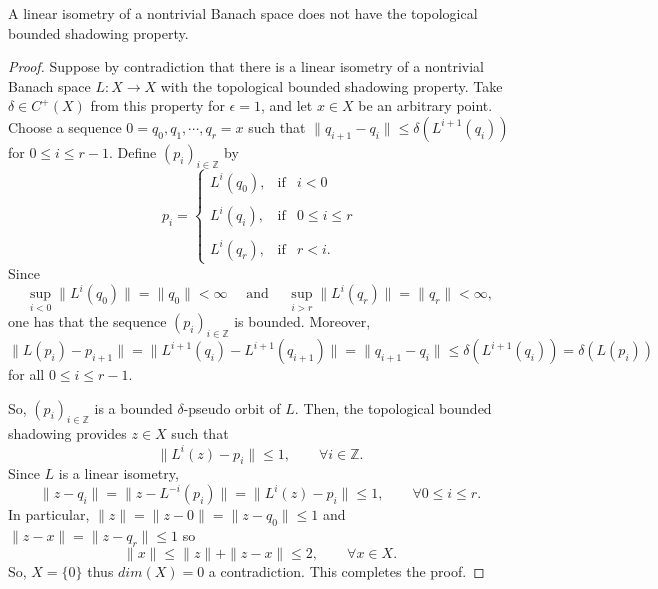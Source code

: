 \documentclass[10pt,a4paper]{amsart}
\begin{document}
\begin{lem}
\label{l1}
A linear isometry of a nontrivial Banach space does not have the topological bounded shadowing property.
\end{lem}

\begin{proof}

Suppose by contradiction that there is a linear isometry of a nontrivial Banach space $L:X\to X$ with the topological bounded shadowing property.
Take $\delta\in C^+(X)$ from this property for $\epsilon=1$,
and let $x\in X$ be an arbitrary point.
Choose a sequence
$0=q_0, q_1,\cdots, q_r=x$ such that
$\|q_{i+1}-q_i\|\leq\delta(L^{i+1}(q_i))$ for $0\leq i\leq r-1$.
Define $(p_i)_{i\in\mathbb{Z}}$ by
$$
p_i = \left\{ \begin{array}{rcl}
L^i(q_0),& \mbox{if} & i<0\\
& & \\
L^i(q_i), & \mbox{if} & 0\leq i\leq r\\
& & \\
L^i(q_r), & \mbox{if} & r<i.
\end{array} \right.
$$
Since
$$
\sup_{i<0}\|L^i(q_0)\|=\|q_0\|<\infty\quad\mbox{ and }\quad
\sup_{i>r}\|L^i(q_r)\|=\|q_r\|<\infty,
$$
one has that the sequence $(p_i)_{i\in\mathbb{Z}}$ is bounded.
Moreover,
$$
\|L(p_i)-p_{i+1}\|=\|L^{i+1}(q_i)-L^{i+1}(q_{i+1})\|=\|q_{i+1}-q_i\|\leq\delta(L^{i+1}(q_i))=\delta(L(p_i))
$$
for all $0\leq i\leq r-1$.

So, $(p_i)_{i\in\mathbb{Z}}$ is a bounded
$\delta$-pseudo orbit of $L$.
Then, the topological bounded shadowing provides
$z\in X$ such that
$$
\|L^i(z)-p_i\|\leq 1,\quad\quad\forall i\in\mathbb{Z}.
$$
Since $L$ is a linear isometry,
$$
\|z-q_i\|=\|z-L^{-i}(p_i)\|=\|L^i(z)-p_i\|\leq1,\quad\quad\forall 0\leq i\leq r.
$$
In particular,
$\|z\|=\|z-0\|=\|z-q_0\|\leq1$ and $\|z-x\|=\|z-q_r\|\leq1$ so
$$
\|x\|\leq \|z\|+\|z-x\|\leq 2,\quad\quad\forall x\in X.
$$
So, $X=\{0\}$ thus $dim(X)=0$ a contradiction. This completes the proof.
\end{proof}
\end{document}
